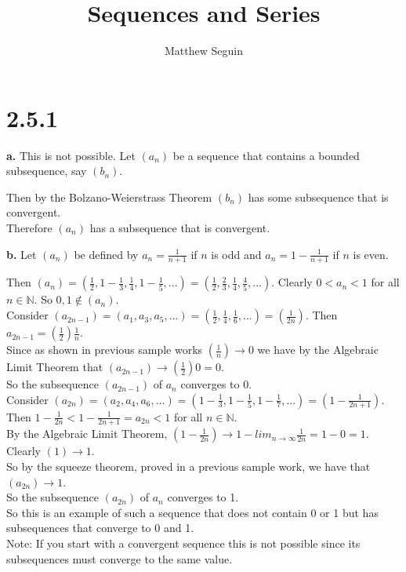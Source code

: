 \documentclass{article}
\title{Sequences and Series}
\author{Matthew Seguin}
\date{}
\begin{document}
\maketitle


\section*{2.5.1}

{\Large \textbf{a.}} This is not possible. Let $(a_n)$ be a sequence that contains a bounded subsequence, say $(b_n)$.
\begin{center}
    \doublespacing
    Then by the Bolzano-Weierstrass Theorem $(b_n)$ has some subsequence that is convergent.
    \\Therefore $(a_n)$ has a subsequence that is convergent.
\end{center}

{\Large \textbf{b.}} Let $(a_n)$ be defined by $a_n =\frac{1}{n + 1}$ if $n$ is odd and $a_n = 1 -\frac{1}{n + 1}$ if $n$ is even.
\begin{center}
    \doublespacing
    Then $(a_n) = (\frac{1}{2}, 1 -\frac{1}{3},\frac{1}{4}, 1 -\frac{1}{5}, ...) = (\frac{1}{2},\frac{2}{3},\frac{1}{4},\frac{4}{5}, ...)$. Clearly $0 < a_n < 1$ for all $n\in\mathbb{N}$. So $0,1\notin (a_n)$.
    \\Consider $(a_{2n - 1}) = (a_1, a_3, a_5, ...) = (\frac{1}{2},\frac{1}{4},\frac{1}{6}, ...) = (\frac{1}{2n})$. Then $a_{2n - 1} = (\frac{1}{2}) \frac{1}{n}$.
    \\Since as shown in previous sample works $(\frac{1}{n})\rightarrow 0$ we have by the Algebraic Limit Theorem that $(a_{2n - 1})\rightarrow (\frac{1}{2}) 0 = 0$.
    \\So the subsequence $(a_{2n-1})$ of $a_n$ converges to 0.
    \\Consider $(a_{2n}) = (a_2, a_4, a_6, ...) = (1 -\frac{1}{3}, 1 -\frac{1}{5}, 1 - \frac{1}{7}, ...) = (1 - \frac{1}{2n+1})$.
    \\Then $1 -\frac{1}{2n} < 1 -\frac{1}{2n+1} = a_{2n} < 1$ for all $n\in\mathbb{N}$. 
    \\By the Algebraic Limit Theorem, $(1 -\frac{1}{2n})\rightarrow 1 - lim_{n\rightarrow\infty}\frac{1}{2n} = 1 - 0 = 1$. Clearly $(1)\rightarrow 1$.
    \\So by the squeeze theorem, proved in a previous sample work, we have that $(a_{2n})\rightarrow 1$.
    \\So the subsequence $(a_{2n})$ of $a_n$ converges to 1.
    \\So this is an example of such a sequence that does not contain 0 or 1 but has subsequences that converge to 0 and 1.
    \\Note: If you start with a convergent sequence this is not possible since its subsequences must converge to the same value.
\end{center}
\end{document}
